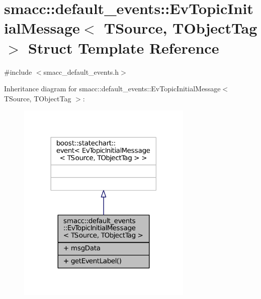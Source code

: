 \hypertarget{structsmacc_1_1default__events_1_1EvTopicInitialMessage}{}\section{smacc\+:\+:default\+\_\+events\+:\+:Ev\+Topic\+Initial\+Message$<$ T\+Source, T\+Object\+Tag $>$ Struct Template Reference}
\label{structsmacc_1_1default__events_1_1EvTopicInitialMessage}


{\ttfamily \#include $<$smacc\+\_\+default\+\_\+events.\+h$>$}



Inheritance diagram for smacc\+:\+:default\+\_\+events\+:\+:Ev\+Topic\+Initial\+Message$<$ T\+Source, T\+Object\+Tag $>$\+:
\nopagebreak
\begin{figure}[H]
\begin{center}
\leavevmode
\includegraphics[width=237pt]{structsmacc_1_1default__events_1_1EvTopicInitialMessage__inherit__graph}
\end{center}
\end{figure}


